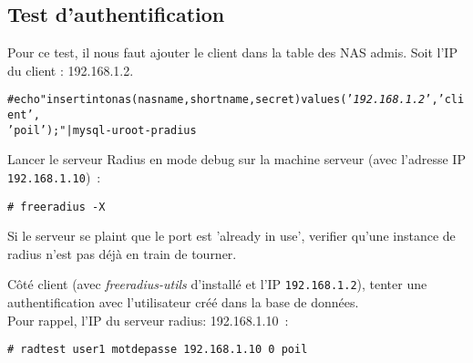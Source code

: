 \subsection{Test d'authentification}
Pour ce test, il nous faut ajouter le client dans la table des NAS admis. Soit l'IP du client : 192.168.1.2.
\begin{alltt}
# echo "insert into nas(nasname,shortname,secret) values ('\emph{192.168.1.2}','client',\\'poil'); " | mysql -uroot -p radius
\end{alltt}

Lancer le serveur Radius en mode debug sur la machine serveur (avec l'adresse IP \texttt{192.168.1.10})~:
\begin{verbatim}
# freeradius -X
\end{verbatim}
Si le serveur se plaint que le port est 'already in use', verifier qu'une instance de radius n'est pas déjà en train de tourner.

Côté client (avec \emph{freeradius-utils} d'installé et l'IP \texttt{192.168.1.2}), tenter une authentification avec l'utilisateur créé dans la base de données.\\
Pour rappel, l'IP du serveur radius: 192.168.1.10~:
\begin{verbatim}
# radtest user1 motdepasse 192.168.1.10 0 poil
\end{verbatim}

